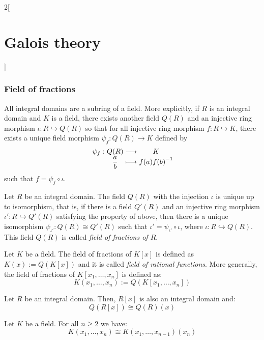 \documentclass[../../../main.tex]{subfiles}
\begin{document}
\begin{multicols}{2}[\section{Galois theory}]
  \subsubsection{Field of fractions}
  \begin{theorem}
    All integral domains are a subring of a field. More explicitly, if $R$ is an integral domain and $K$ is a field, there exists another field $Q(R)$ and an injective ring morphism $\iota:R\hookrightarrow Q(R)$ so that for all injective ring morphism $f:R\hookrightarrow K$, there exists a unique field morphism $\psi_f:Q(R)\rightarrow K$ defined by
    $$
      \function{\psi_f}{Q(R)}{K}{\displaystyle\frac{a}{b}}{f(a){f(b)}^{-1}}
    $$
    such that $f=\psi_f\circ\iota$.
  \end{theorem}
  \begin{corollary}
    Let $R$ be an integral domain. The field $Q(R)$ with the injection $\iota$ is unique up to isomorphism, that is, if there is a field $Q'(R)$ and an injective ring morphism $\iota':R\hookrightarrow Q'(R)$ satisfying the property of above, then there is a unique isomorphism $\psi_{\iota'}:Q(R)\cong Q'(R)$ such that $\iota'=\psi_{\iota'}\circ\iota$, where $\iota:R\hookrightarrow Q(R)$. This field $Q(R)$ is called \textit{field of fractions of $R$}.
  \end{corollary}
  \begin{definition}
    Let $K$ be a field. The field of fractions of $K[x]$ is defined as $K(x):=Q(K[x])$ and it is called \textit{field of rational functions}. More generally, the field of fractions of $K[x_1,\ldots,x_n]$ is defined as: $$K(x_1,\ldots,x_n):=Q(K[x_1,\ldots,x_n])$$
  \end{definition}
  \begin{lemma}
    Let $R$ be an integral domain. Then, $R[x]$ is also an integral domain and: $$Q(R[x])\cong Q(R)(x)$$
  \end{lemma}
  \begin{corollary}
    Let $K$ be a field. For all $n\geq 2$ we have: $$K(x_1,\ldots,x_n)\cong K(x_1,\ldots,x_{n-1})(x_n)$$
  \end{corollary}

\end{multicols}
\end{document}
